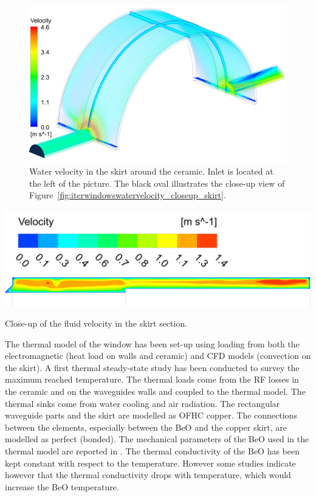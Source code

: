 {\begin{figure}
	\centering
	\includegraphics[width=1.0\linewidth]{figures/chap3/ITER_window/ITER_windows_water_velocity}
	\caption{Water velocity in the skirt around the ceramic. Inlet is located at the left of the picture. The black oval illustrates the close-up view of Figure~\ref{fig:iterwindowswatervelocity_closeup_skirt}.}
	\label{fig:iterwindowswatervelocity}
\end{figure}

\begin{marginfigure}[-5cm]
	\centering
	\includegraphics[width=1.0\linewidth]{figures/chap3/ITER_window/ITER_windows_water_velocity_closeup_skirt}
	\caption{Close-up of the fluid velocity in the skirt section.}
	\label{fig:iterwindowswatervelocity_closeup_skirt}
\end{marginfigure}

The thermal model of the window has been set-up using loading from both the electromagnetic (heat load on walls and ceramic) and CFD models (convection on the skirt). A first thermal steady-state study has been conducted to survey the maximum reached temperature. The thermal loads come from the RF losses in the ceramic and on the waveguides walls and coupled to the thermal model. The thermal sinks come from water cooling and air radiation. The rectangular waveguide parts and the skirt are modelled as OFHC copper. The connections between the elements, especially between the BeO and the copper skirt, are modelled as perfect (bonded). The mechanical parameters of the BeO used in the thermal model are reported in \cite{hillairet2015}. The thermal conductivity of the BeO has been kept constant with respect to the temperature. However some studies indicate however that the thermal conductivity drops with temperature, which would increase the BeO temperature. 

}

